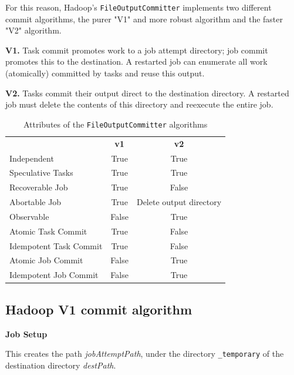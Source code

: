 \documentclass[conference]{IEEEtran}
\begin{document}
For this reason, Hadoop's \texttt{FileOutputCommitter} implements two
different commit algorithms, the purer "V1" and more robust algorithm and the
faster "V2" algorithm.


\textbf{V1.}
Task commit promotes work to a job attempt directory;
job commit promotes this to the destination.
A restarted job can enumerate all work (atomically)
committed by tasks and reuse this output.

\textbf{V2.}
Tasks commit their output direct to the destination directory.
A restarted job must delete the contents of this directory and reexecute
the entire job.

\begin{table}
  \caption{Attributes of the \texttt{FileOutputCommitter} algorithms}
  \begin{tabular}{ l c c }
    \hline
    & \textbf{v1} & \textbf{v2} \\
    Independent & True & True \\
    Speculative Tasks & True & True \\
    Recoverable Job & True & False \\
    Abortable Job & True & Delete output directory \\
    Observable & False & True \\
    Atomic Task Commit & True & False \\
    Idempotent Task Commit & True & False \\
    Atomic Job Commit & False & True \\
    Idempotent Job Commit & False & True \\
    \hline
  \end{tabular}
  \label{tab:file-committer-attributes}
\end{table}


\subsection{Hadoop V1 commit algorithm}
\label{subsec:hadoopV1CommitAlgorithm}


\textbf{Job Setup}

This creates the path \emph{jobAttemptPath}, under the
directory \texttt{\_temporary} of the destination directory
\emph{destPath}.
\end{document}
